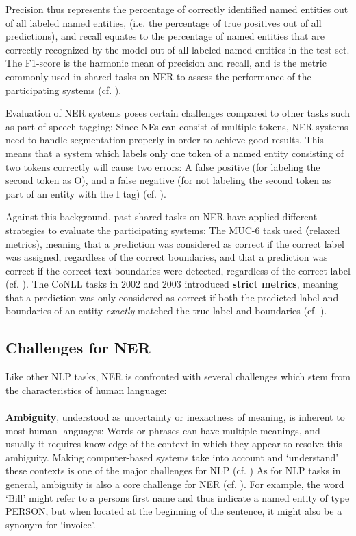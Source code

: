 Precision thus represents the percentage of correctly identified named entities out of all labeled named entities, (i.e. the percentage of true positives out of all predictions), and recall equates to the percentage of named entities that are correctly recognized by the model out of all labeled named entities in the test set.  The F1-score is the harmonic mean of precision and recall, and is the metric commonly used in shared tasks on NER to assess the performance of the participating systems (cf. \cite[241]{zong_information_2021}).

Evaluation of NER systems poses certain challenges compared to other tasks such as part-of-speech tagging: Since NEs can consist of multiple tokens, NER systems need to handle segmentation properly in order to achieve good results. This means that a system which labels only one token of a named entity consisting of two tokens correctly will cause two errors: A false positive (for labeling the second token as O), and a false negative (for not labeling the second token as part of an entity with the I tag) (cf. \cite[20]{jurafsky_2021_8}). 

Against this background, past shared tasks on NER have applied different strategies to evaluate the participating systems: The MUC-6 task used \textbf(relaxed metrics), meaning that a prediction was considered as correct if the correct label was assigned, regardless of the correct boundaries, and that a prediction was correct if the correct text boundaries were detected, regardless of the correct label (cf. \cite{yadav_survey_2019}). 
The CoNLL tasks in 2002 and 2003 introduced \textbf{strict metrics}, meaning that a prediction was only considered as correct if both the predicted label and boundaries of an entity \textit{exactly} matched the true label and boundaries (cf. \cite{yadav_survey_2019}).  

\subsection{Challenges for NER}
Like other NLP tasks, NER is confronted with several challenges which stem from the characteristics of human language:

\paragraph{}
\textbf{Ambiguity}, understood as uncertainty or inexactness of meaning, is inherent to most human languages: Words or phrases can have multiple meanings, and usually it requires knowledge of the context in which they appear to resolve this ambiguity. Making computer-based systems take into account and `understand' these contexts is one of the major challenges for NLP (cf. \cite[12-13]{vajjala_practical_2020}) As for NLP tasks in general, ambiguity is also a core challenge for NER (cf.  \cite[386]{aggarwal_machine_2018}). For example, the word `Bill' might refer to a persons first name and thus indicate a named entity of type PERSON, but when located at the beginning of the sentence, it might also be a synonym for `invoice'. 

